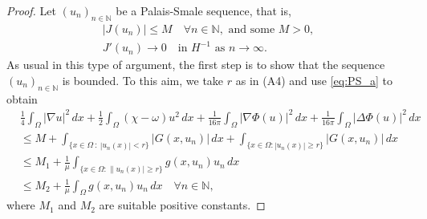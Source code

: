 \documentclass[reqno]{amsart}
\begin{document}
\begin{proof}
 Let $(u_n)_{n \in \mathbb N}$ be a Palais-Smale sequence, that is,
 \begin{gather}
  |J(u_n)| \leq M \quad \forall n \in \mathbb N, \text{ and  some } M > 0, 
   \label{eq:PS_a} \\
  J'(u_n) \to 0 \quad \text{in } H^{-1} \text{ as } n \to \infty. \label{eq:PS_b}
 \end{gather}
As usual in this type of argument, the first step is to show that the sequence 
$(u_n)_{n \in \mathbb N}$ is bounded. To this aim, we take $r$ as in (A4)
and  use  \eqref{eq:PS_a} to obtain
\begin{equation}
\begin{aligned}
&\frac{1}{4} \int_\Omega |\nabla u|^2 \,dx
  + \frac{1}{2} \int_\Omega (\chi - \omega) u^2 \,dx
  + \frac{1}{16 \pi} \int_\Omega |\nabla \Phi(u)|^2 \,dx
  + \frac{1}{16 \pi} \int_\Omega |\Delta \Phi(u)|^2 \,dx  \\
& \leq M + \int_{\{x \in \Omega \ : \ |u_n(x)| < r\}} |G(x, u_n)| \,dx
 + \int_{\{x \in \Omega  :  |u_n(x)| \geq r\}} |G(x, u_n)| \,dx  \\
& \leq M_1 + \frac{1}{\mu} \int_{\{x \in \Omega  : \|u_n(x)| \geq r\}} g(x, u_n) u_n \,dx  \\
& \leq M_2 + \frac{1}{\mu} \int_\Omega g(x, u_n) u_n \,dx \quad
\forall n \in \mathbb N,
\end{aligned}\label{eq:estimate_PS_a}
\end{equation}
where $M_1$ and $M_2$ are suitable positive constants.


\end{proof}
\end{document}
